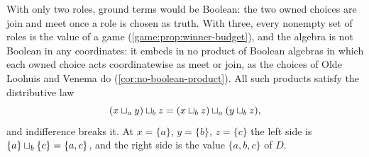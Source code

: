 With only two roles, ground terms would be Boolean: the two owned choices are join and meet once a role is chosen as truth. With three, every nonempty set of roles is the value of a game (\cref{game:prop:winner-budget}), and the algebra is not Boolean in any coordinates: it embeds in no product of Boolean algebras in which each owned choice acts coordinatewise as meet or join, as the choices of Olde Loohuis and Venema do (\cref{cor:no-boolean-product}). All such products satisfy the distributive law
\[
 (x\mathbin{\sqcup_{a}} y)\mathbin{\sqcup_{b}} z=(x\mathbin{\sqcup_{b}} z)\mathbin{\sqcup_{a}}(y\mathbin{\sqcup_{b}} z),
\]
and indifference breaks it. At $x=\{a\}$, $y=\{b\}$, $z=\{c\}$ the left side is $\{a\}\mathbin{\sqcup_{b}}\{c\}=\{a,c\}$, and the right side is the value $\{a,b,c\}$ of $D$.
